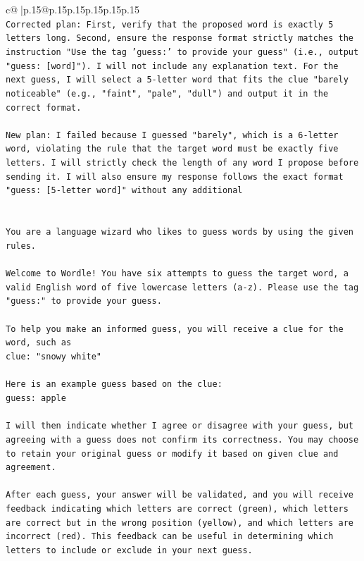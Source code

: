 \documentclass{article}
\begin{document}
{\begin{supertabular}{c@{$\;$}|p{.15\linewidth}@{}p{.15\linewidth}p{.15\linewidth}p{.15\linewidth}p{.15\linewidth}p{.15\linewidth}}
{{{\\ 
\texttt{Corrected plan: First, verify that the proposed word is exactly 5 letters long. Second, ensure the response format strictly matches the instruction "Use the tag 'guess:' to provide your guess" (i.e., output "guess: {[}word{]}"). I will not include any explanation text. For the next guess, I will select a 5{-}letter word that fits the clue "barely noticeable" (e.g., "faint", "pale", "dull") and output it in the correct format.} \\
\\ 
\texttt{New plan: I failed because I guessed "barely", which is a 6{-}letter word, violating the rule that the target word must be exactly five letters. I will strictly check the length of any word I propose before sending it. I will also ensure my response follows the exact format "guess: {[}5{-}letter word{]}" without any additional} \\
\\ 
\\ 
\texttt{You are a language wizard who likes to guess words by using the given rules.} \\
\\ 
\texttt{Welcome to Wordle! You have six attempts to guess the target word, a valid English word of five lowercase letters (a{-}z). Please use the tag "guess:" to provide your guess.} \\
\\ 
\texttt{To help you make an informed guess, you will receive a clue for the word, such as} \\
\texttt{clue: "snowy white"} \\
\\ 
\texttt{Here is an example guess based on the clue: } \\
\texttt{guess: apple} \\
\\ 
\texttt{I will then indicate whether I agree or disagree with your guess, but agreeing with a guess does not confirm its correctness. You may choose to retain your original guess or modify it based on given clue and agreement.} \\
\\ 
\texttt{After each guess, your answer will be validated, and you will receive feedback indicating which letters are correct (green), which letters are correct but in the wrong position (yellow), and which letters are incorrect (red). This feedback can be useful in determining which letters to include or exclude in your next guess.} \\
}}}
\end{supertabular}}
\end{document}
